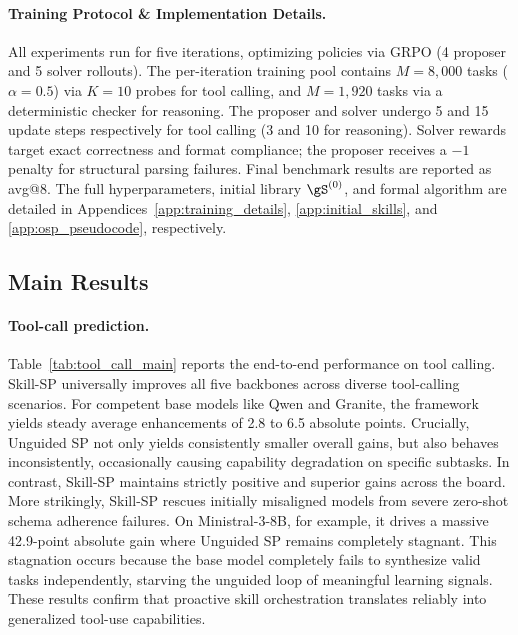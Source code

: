 \paragraph{Training Protocol \& Implementation Details.}
All experiments run for five iterations, optimizing policies via GRPO (4 proposer and 5 solver rollouts). The per-iteration training pool contains $M=8{,}000$ tasks ($\alpha=0.5$) via $K=10$ probes for tool calling, and $M=1{,}920$ tasks via a deterministic checker for reasoning. The proposer and solver undergo 5 and 15 update steps respectively for tool calling (3 and 10 for reasoning). Solver rewards target exact correctness and format compliance; the proposer receives a $-1$ penalty for structural parsing failures. Final benchmark results are reported as avg@8. The full hyperparameters, initial library $\gS^{(0)}$, and formal algorithm are detailed in Appendices~\ref{app:training_details}, \ref{app:initial_skills}, and \ref{app:osp_pseudocode}, respectively.







\subsection{Main Results}
\label{sec:main_results}


\paragraph{Tool-call prediction.}
Table~\ref{tab:tool_call_main} reports the end-to-end performance on tool calling. Skill-SP universally improves all five backbones across diverse tool-calling scenarios. For competent base models like Qwen and Granite, the framework yields steady average enhancements of 2.8 to 6.5 absolute points. Crucially, Unguided SP not only yields consistently smaller overall gains, but also behaves inconsistently, occasionally causing capability degradation on specific subtasks. In contrast, Skill-SP maintains strictly positive and superior gains across the board. More strikingly, Skill-SP rescues initially misaligned models from severe zero-shot schema adherence failures. On Ministral-3-8B, for example, it drives a massive 42.9-point absolute gain where Unguided SP remains completely stagnant. This stagnation occurs because the base model completely fails to synthesize valid tasks independently, starving the unguided loop of meaningful learning signals. These results confirm that proactive skill orchestration translates reliably into generalized tool-use capabilities.



